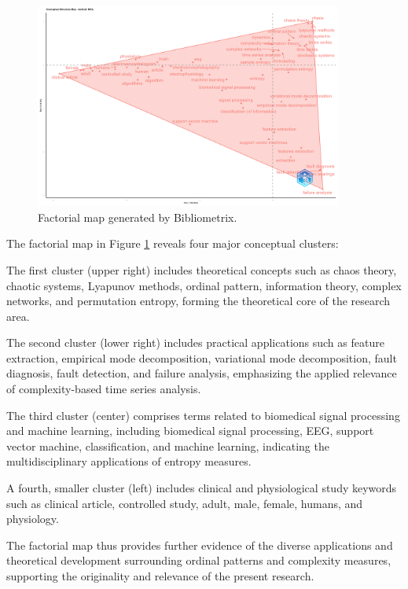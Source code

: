 \begin{figure}[H]
	\centering
	\includegraphics[width=0.9\textwidth]{FactorialMap}
	\caption{Factorial map generated by Bibliometrix.}
	\label{fig:factorialMap}
\end{figure}

The factorial map in Figure \ref{fig:factorialMap} reveals four major conceptual clusters:

The first cluster (upper right) includes theoretical concepts such as chaos theory, chaotic systems, Lyapunov methods, ordinal pattern, information theory, complex networks, and permutation entropy, forming the theoretical core of the research area.

The second cluster (lower right) includes practical applications such as feature extraction, empirical mode decomposition, variational mode decomposition, fault diagnosis, fault detection, and failure analysis, emphasizing the applied relevance of complexity-based time series analysis.

The third cluster (center) comprises terms related to biomedical signal processing and machine learning, including biomedical signal processing, EEG, support vector machine, classification, and machine learning, indicating the multidisciplinary applications of entropy measures.

A fourth, smaller cluster (left) includes clinical and physiological study keywords such as clinical article, controlled study, adult, male, female, humans, and physiology.

The factorial map thus provides further evidence of the diverse applications and theoretical development surrounding ordinal patterns and complexity measures, supporting the originality and relevance of the present research.

